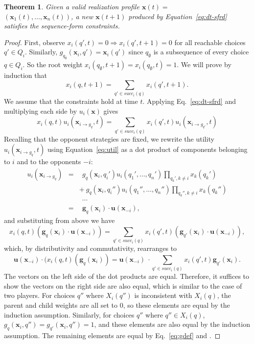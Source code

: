 \documentclass{aamas2014}
\newcommand{\bx}{\mathbf{x}}
\newcommand{\bg}{\mathbf{g}}
\newcommand{\bu}{\mathbf{u}}
\newtheorem{theorem}{Theorem}
\begin{document}
\begin{theorem}
Given a valid realization profile $\bx(t) = $\\ $(\bx_1(t), \ldots, \bx_n(t))$, a new $\bx(t+1)$ produced by
Equation~\ref{eq:dt-sfrd} satisfies the sequence-form constraints. 
\end{theorem}
\begin{proof}
First, observe $x_i(q',t) = 0 \Rightarrow x_i(q',t+1) = 0$ for all reachable choices $q' \in Q_i$. 
Similarly,  $g_{q_{\emptyset}}(\bx_i, q') = \bx_i(q')$ since $q_{\emptyset}$ is a subsequence of every choice 
$q \in Q_i$. So the root weight $x_i(q_{\emptyset}, t+1) = x_i(q_{\emptyset},t) = 1$.   
We will prove by induction that 
\[ x_i(q,t+1) = \sum_{q' \in succ_i(q)} x_i(q',t+1). \]
We assume that the constraints hold at time $t$. 
Applying Eq.~\ref{eq:dt-sfrd} and multiplying each side by $u_i(\bx)$ gives
\[
x_i(q,t) u_i(\bx_{i \rightarrow g_q}, t) = \sum_{q' \in succ_i(q)} x_i(q',t) u_i(\bx_{i \rightarrow g_{q'}},t) 
\]
Recalling that the opponent strategies are fixed, we 
rewrite the utility $u_i(\bx_{i \rightarrow g_q}, t)$ using Equation~\ref{eq:util} as a dot product of 
components belonging to $i$ and to the opponents $-i$: 
\begin{eqnarray*}
u_i(\bx_{i \rightarrow g_q}) & = & ~~g_q(\bx_i, q_i') u_i(q_1', \ldots, q_n') \prod_{q_k', k \not= i} x_k(q_k') \\
                             &   & +~g_q(\bx_i, q_i'') u_i(q_1'', \ldots, q_n'') \prod_{q_k'', k \not= i} x_k(q_k'') \\
                             &   & ~~\cdots \\
                             & = & ~~\bg_q(\bx_i) \cdot \bu(\bx_{-i}),
\end{eqnarray*}
and substituting from above we have 
\[x_i(q,t)(\bg_q(\bx_i) \cdot \bu(\bx_{-i})) = \sum_{q' \in succ_i(q)} x_i(q',t) (\bg_{q'}(\bx_i) \cdot \bu(\bx_{-i})), \]
which, by distributivity and commutativity, rearranges to
\[ \bu(\bx_{-i}) \cdot (x_i(q,t)(\bg_q(\bx_i)) = \bu(\bx_{-i})~\cdot\sum_{q' \in succ_i(q)} x_i(q',t) \bg_{q'}(\bx_i). \]
The vectors on the left side of the dot products are equal.
Therefore, it suffices to show the vectors on the right side are also equal, which is similar to the case of two players.   
For choices $q''$ where $X_i(q'')$ is inconsistent with $X_i(q)$, the parent and child weights are all set to $0$, so these 
elements are equal by the induction assumption. 
Similarly, for choices $q''$ where $q'' \in X_i(q)$, $g_q(\bx_i, q'') = g_{q'}(\bx_i, q'') = 1$, and these elements are also 
equal by the induction assumption. 
The remaining elements are equal by Eq.~\ref{eq:gdef} and \cite[Lemma 6]{Gatti13Efficient}. 
\end{proof}
\end{document}
